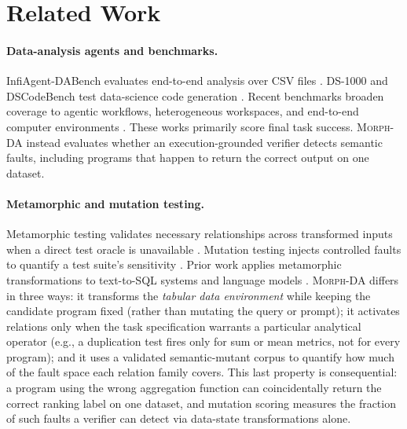 \documentclass{article}
\newcommand{\morph}{\textsc{Morph-DA}\xspace}
\begin{document}
\section{Related Work}
\label{sec:related}

\paragraph{Data-analysis agents and benchmarks.}
InfiAgent-DABench evaluates end-to-end analysis over CSV files \citep{hu2024infiagent}. DS-1000 and DSCodeBench test data-science code generation \citep{lai2022ds1000,ouyang2025dscodebench}. Recent benchmarks broaden coverage to agentic workflows, heterogeneous workspaces, and end-to-end computer environments \citep{zhang2025datascibench,nam2026dsstar,li2026dataspace,sun2026agenticdatabench,rahman2026dsagentbench}. These works primarily score final task success. \morph instead evaluates whether an execution-grounded verifier detects semantic faults, including programs that happen to return the correct output on one dataset.

\paragraph{Metamorphic and mutation testing.}
Metamorphic testing validates necessary relationships across transformed inputs when a direct test oracle is unavailable \citep{segura2016survey}. Mutation testing injects controlled faults to quantify a test suite's sensitivity \citep{jia2011mutation,petrovic2021mutation}. Prior work applies metamorphic transformations to text-to-SQL systems and language models \citep{ma2020mtteql,yang2025sqlhd,cho2025llmorph}. \morph differs in three ways: it transforms the \emph{tabular data environment} while keeping the candidate program fixed (rather than mutating the query or prompt); it activates relations only when the task specification warrants a particular analytical operator (e.g., a duplication test fires only for sum or mean metrics, not for every program); and it uses a validated semantic-mutant corpus to quantify how much of the fault space each relation family covers. This last property is consequential: a program using the wrong aggregation function can coincidentally return the correct ranking label on one dataset, and mutation scoring measures the fraction of such faults a verifier can detect via data-state transformations alone.
\end{document}
